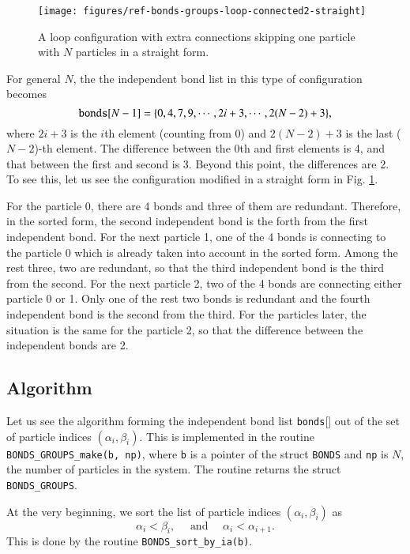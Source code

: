 \begin{figure}
  \centering
  \texttt{[image: figures/ref-bonds-groups-loop-connected2-straight]}
  \caption{
    A loop configuration with extra connections skipping one particle 
    with $N$ particles in a straight form. 
  }
  \label{fig:ref-bonds-groups-loop-connected2-straight}
\end{figure}
For general $N$, the the independent bond list 
in this type of configuration becomes 
\begin{equation}
  {\tt bonds}[N-1] = \{0, 4, 7, 9, \cdots, 2i+3, \cdots, 2(N-2)+3\},
\end{equation}
where $2i+3$ is the $i$th element (counting from 0) 
and $2(N-2)+3$ is the last ($N-2$)-th element. 
The difference between the 0th and first elements is 4, 
and that between the first and second is 3. 
Beyond this point, the differences are 2. 
To see this, let us see the configuration modified in a straight form 
in Fig. \ref{fig:ref-bonds-groups-loop-connected2-straight}. 

For the particle 0, there are 4 bonds and three of them are redundant. 
Therefore, in the sorted form, the second independent bond 
is the forth from the first independent bond. 
For the next particle 1, one of the 4 bonds is connecting to the particle 0 
which is already taken into account in the sorted form. 
Among the rest three, two are redundant, so that the third independent bond 
is the third from the second. 
For the next particle 2, two of the 4 bonds are connecting 
either particle 0 or 1. Only one of the rest two bonds is redundant 
and the fourth independent bond is the second  from the third. 
For the particles later, the situation is the same for 
the particle 2, so that the difference between the independent bonds are 2. 


\subsection{Algorithm}
\label{sec:ref-bonds-groups-independent-bond-list-algorithm}
Let us see the algorithm forming the independent bond list {\tt bonds}[] 
out of the set of particle indices $(\alpha_{i}, \beta_{i})$. 
This is implemented in the routine {\tt BONDS\_GROUPS\_make(b, np)}, 
where {\tt b} is a pointer of the struct {\tt BONDS} 
and {\tt np} is $N$, the number of particles in the system. 
The routine returns the struct {\tt BONDS\_GROUPS}. 


At the very beginning, we sort the list of particle indices 
$(\alpha_{i}, \beta_{i})$ as 
\begin{equation}
  \alpha_{i} < \beta_{i},
  \quad\text{ and }\quad
  \alpha_{i} < \alpha_{i+1}.
  \label{eq:ref-bonds-groups-BONDS-sort-alpha-beta}
\end{equation}
This is done by the routine {\tt BONDS\_sort\_by\_ia(b)}.

